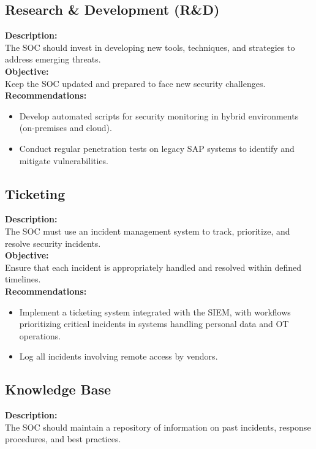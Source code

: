 \subsection*{ Research \& Development (R\&D)}
\textbf{Description:} \\
The SOC should invest in developing new tools, techniques, and strategies to address emerging threats. \\

\textbf{Objective:} \\
Keep the SOC updated and prepared to face new security challenges. \\

\textbf{Recommendations:}
\begin{itemize}
    \item Develop automated scripts for security monitoring in hybrid environments (on-premises and cloud).
    \item Conduct regular penetration tests on legacy SAP systems to identify and mitigate vulnerabilities.
\end{itemize}

\subsection*{Ticketing}
\textbf{Description:} \\
The SOC must use an incident management system to track, prioritize, and resolve security incidents. \\

\textbf{Objective:} \\
Ensure that each incident is appropriately handled and resolved within defined timelines. \\

\textbf{Recommendations:}
\begin{itemize}
    \item Implement a ticketing system integrated with the SIEM, with workflows prioritizing critical incidents in systems handling personal data and OT operations.
    \item Log all incidents involving remote access by vendors.
\end{itemize}

\subsection*{ Knowledge Base}
\textbf{Description:} \\
The SOC should maintain a repository of information on past incidents, response procedures, and best practices. \\

